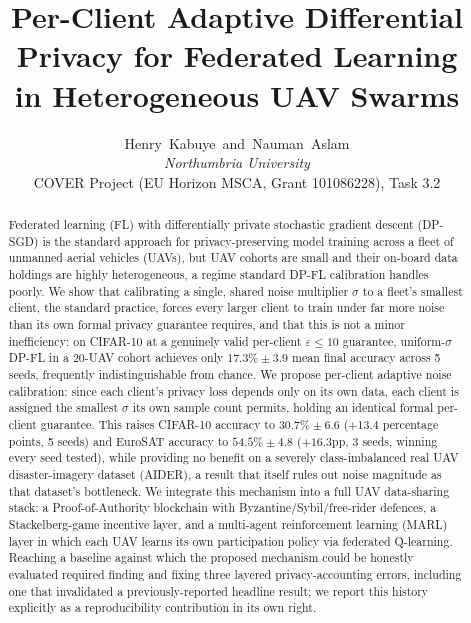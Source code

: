 \documentclass[journal]{IEEEtran}
\begin{document}
\title{Per-Client Adaptive Differential Privacy for Federated Learning\\
in Heterogeneous UAV Swarms}

\author{Henry~Kabuye~and~Nauman~Aslam\\
\textit{Northumbria University}\\
COVER Project (EU Horizon MSCA, Grant 101086228), Task 3.2}


\maketitle

\begin{abstract}
Federated learning (FL) with differentially private stochastic gradient
descent (DP-SGD) is the standard approach for privacy-preserving model
training across a fleet of unmanned aerial vehicles (UAVs), but UAV
cohorts are small and their on-board data holdings are highly
heterogeneous, a regime standard DP-FL calibration handles poorly. We
show that calibrating a single, shared noise multiplier $\sigma$ to a
fleet's smallest client, the standard practice, forces every larger
client to train under far more noise than its own formal privacy
guarantee requires, and that this is not a minor inefficiency: on
CIFAR-10 at a genuinely valid per-client $\varepsilon\le10$ guarantee,
uniform-$\sigma$ DP-FL in a 20-UAV cohort achieves only
$17.3\%\pm3.9$ mean final accuracy across 5 seeds, frequently
indistinguishable from chance. We propose per-client adaptive noise
calibration: since each client's privacy loss depends only on its own
data, each client is assigned the smallest $\sigma$ its own sample
count permits, holding an identical formal per-client guarantee. This
raises CIFAR-10 accuracy to $30.7\%\pm6.6$ ($+13.4$ percentage points,
5 seeds) and EuroSAT accuracy to $54.5\%\pm4.8$ ($+16.3$pp, 3 seeds,
winning every seed tested), while providing no benefit on a severely
class-imbalanced real UAV disaster-imagery dataset (AIDER), a result
that itself rules out noise magnitude as that dataset's bottleneck. We
integrate this mechanism into a full UAV data-sharing stack: a
Proof-of-Authority blockchain with Byzantine/Sybil/free-rider defences,
a Stackelberg-game incentive layer, and a multi-agent reinforcement
learning (MARL) layer in which each UAV learns its own participation
policy via federated Q-learning. Reaching a baseline against which the
proposed mechanism could be honestly evaluated required finding and
fixing three layered privacy-accounting errors, including one that
invalidated a previously-reported headline result; we report this
history explicitly as a reproducibility contribution in its own right.
\end{abstract}
\end{document}
